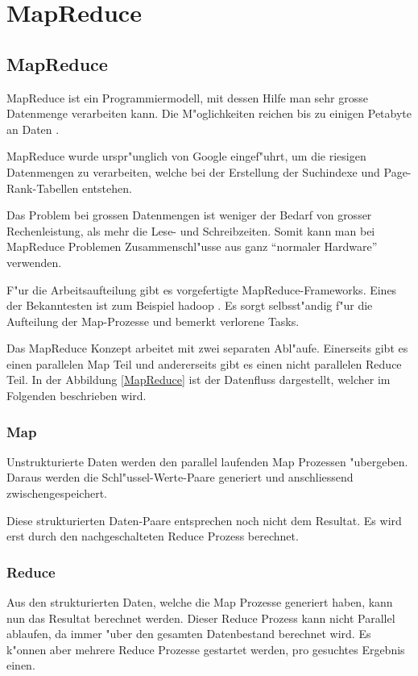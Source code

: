 \chapter{MapReduce}
\begin{refsection}

\section{MapReduce}
MapReduce ist ein Programmiermodell, mit dessen Hilfe man sehr grosse
Datenmenge verarbeiten kann.  Die M"oglichkeiten reichen bis zu
einigen Petabyte an Daten \cite{wiki:mapReduce}.

MapReduce wurde urspr"unglich von Google eingef"uhrt, um die riesigen
Datenmengen zu verarbeiten, welche bei der Erstellung der Suchindexe
und Page-Rank-Tabellen entstehen.

Das Problem bei grossen Datenmengen ist weniger der Bedarf von grosser
Rechenleistung, als mehr die Lese- und Schreibzeiten.  Somit kann man
bei MapReduce Problemen Zusammenschl"usse aus ganz \enquote{normaler
Hardware} verwenden.

F"ur die Arbeitsaufteilung gibt es vorgefertigte
MapReduce-Frameworks.  Eines der Bekanntesten ist zum Beispiel hadoop
\cite{apache:hadoop}.  Es sorgt selbsst"andig f"ur die Aufteilung der
Map-Prozesse und bemerkt verlorene Tasks.

Das MapReduce Konzept arbeitet mit zwei separaten Abl"aufe.
Einerseits gibt es einen parallelen Map Teil und andererseits gibt es
einen nicht parallelen Reduce Teil.  In der Abbildung \ref{MapReduce}
ist der Datenfluss dargestellt, welcher im Folgenden beschrieben wird.

\subsection{Map}
Unstrukturierte Daten werden den parallel laufenden Map Prozessen
"ubergeben.  Daraus werden die Schl"ussel-Werte-Paare generiert und
anschliessend zwischengespeichert.

Diese strukturierten Daten-Paare entsprechen noch nicht dem
Resultat. Es wird erst durch den nachgeschalteten Reduce Prozess
berechnet.

\subsection{Reduce}
Aus den strukturierten Daten, welche die Map Prozesse generiert haben,
kann nun das Resultat berechnet werden.  Dieser Reduce Prozess kann
nicht Parallel ablaufen, da immer "uber den gesamten Datenbestand
berechnet wird.  Es k"onnen aber mehrere Reduce Prozesse gestartet
werden, pro gesuchtes Ergebnis einen.


\end{refsection}
